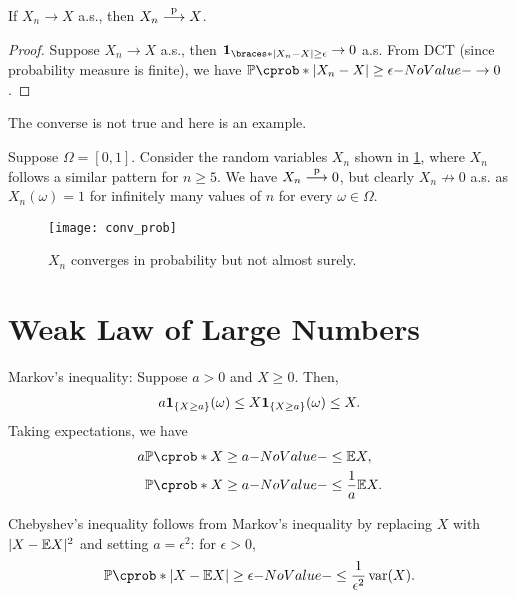 \documentclass[12pt]{article}
\begin{document}
\begin{Lemma}\label{wk5:Lem:Convergence in probability}
If $X_n \to X$ a.s., then $X_n \stackrel{\mathrm{p}}{\longrightarrow} X$.
\end{Lemma}
\begin{proof}
Suppose $X_n \to X$ a.s., then $\indicator{|X_n-X|\geq \epsilon} \to 0$ a.s. From DCT (since probability measure is finite), we have $\P(|X_n-X|\geq \epsilon)\to 0$.
\end{proof}

The converse is not true and here is an example.

\begin{Example}
Suppose $\Omega=[0,1]$. Consider the random variables $X_n$ shown in \cref{wk5:fg:Counter Example}, where $X_n$ follows a similar pattern for $n\geq 5$. We have $X_n \stackrel{\mathrm{p}}{\longrightarrow} 0$, but clearly $X_n \nrightarrow 0$ a.s. as $X_n(\omega) = 1$ for infinitely many values of $n$ for every $\omega\in\Omega$.

\begin{figure}[!htb]
\centering
\texttt{[image: conv\_prob]} 
\caption{$X_n$ converges in probability but not almost surely.} 
\label{wk5:fg:Counter Example}
\end{figure}
\end{Example}

\section{Weak Law of Large Numbers}

Markov’s inequality: Suppose $a>0$ and $X\geq 0$. Then, 
\begin{align*}
a {\bf 1}_{\{X\geq a\}}(\omega) \leq X{\bf 1}_{\{X\geq a\}}(\omega)\leq X.
\end{align*}
Taking expectations, we have
\begin{align*}
a\P(X\geq a) & \leq \E X,\\
\P(X\geq a) & \leq \frac{1}{a}\E X.
\end{align*}

Chebyshev's inequality follows from Markov's inequality by replacing $X$ with $|X- \E X|^2$ and setting $a=\epsilon^2$: for $\epsilon>0$, 
\begin{align*}
\P( |X- \E X | \geq \epsilon) \leq \frac{1}{\epsilon ^2} \var(X).
\end{align*}
\end{document}
